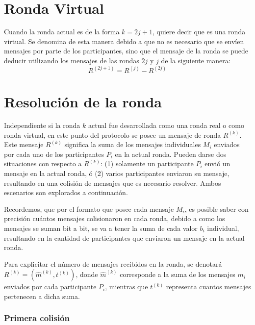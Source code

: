 \section{Ronda Virtual}

Cuando la ronda actual es de la forma $k = 2j + 1$, quiere decir que es una ronda 
virtual. Se denomina de esta manera debido a que no es necesario que se envíen 
mensajes por parte de los participantes, sino que el mensaje de la ronda se puede 
deducir utilizando los mensajes de las rondas $2j$ y $j$ de la siguiente manera: 
$$R^{(2j + 1)} = R^{(j)} - R^{(2j)}$$


\section{Resolución de la ronda}

Independiente si la ronda $k$ actual fue desarrollada como una ronda real o como 
ronda virtual, en este punto del protocolo se posee un mensaje de ronda $R^{(k)}$. 
Este mensaje $R^{(k)}$ significa la suma de los mensajes individuales $M_i$ 
enviados por cada uno de los participantes $P_i$ en la actual ronda. Pueden darse 
dos situaciones con respecto a $R^{(k)}$: (1) solamente un participante $P_i$ envió 
un mensaje en la actual ronda, ó (2) varios participantes enviaron su mensaje, 
resultando en una colisión de mensajes que es necesario resolver. Ambos escenarios 
son explorados a continuación.

Recordemos, que por el formato que posee cada mensaje $M_i$, es posible saber con 
precisión cuántos mensajes colisionaron en cada ronda, debido a como los mensajes 
se suman bit a bit, se va a tener la suma de cada valor $b_i$ individual, resultando 
en la cantidad de participantes que enviaron un mensaje en la actual ronda.

Para explicitar el número de mensajes recibidos en la ronda, se denotará 
$R^{(k)} = (\hat{m}^{(k)}, t^{(k)})$, donde $\hat{m}^{(k)}$ corresponde a la suma de 
los mensajes $m_i$ enviados por cada participante $P_i$, mientras que $t^{(k)}$ 
representa cuantos mensajes pertenecen a dicha suma.

\subsubsection{Primera colisión}

